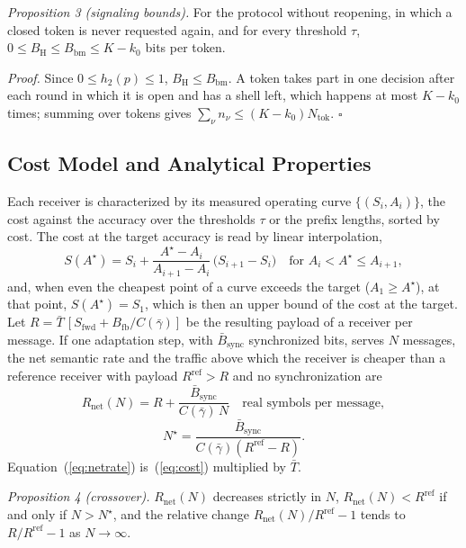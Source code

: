 \emph{Proposition 3 (signaling bounds).} For the protocol without reopening, in which a closed token is never requested again, and for every threshold $\tau$, $0\le B_\mathrm{H}\le B_\mathrm{bm}\le K-k_0$ bits per token.

\emph{Proof.} Since $0\le h_2(p)\le 1$, $B_\mathrm{H}\le B_\mathrm{bm}$. A token takes part in one decision after each round in which it is open and has a shell left, which happens at most $K-k_0$ times; summing over tokens gives $\sum_\nu n_\nu\le (K-k_0)N_\mathrm{tok}$. $\square$

\subsection{Cost Model and Analytical Properties}
\label{sec:method-cost}

Each receiver is characterized by its measured operating curve $\{(S_i,A_i)\}$, the cost against the accuracy over the thresholds $\tau$ or the prefix lengths, sorted by cost. The cost at the target accuracy is read by linear interpolation,
\begin{equation}
S(A^\star) = S_i + \frac{A^\star - A_i}{A_{i+1}-A_i}\,\bigl(S_{i+1}-S_i\bigr)\quad\text{for } A_i < A^\star \le A_{i+1},
\label{eq:readoff}
\end{equation}
and, when even the cheapest point of a curve exceeds the target ($A_1\ge A^\star$), at that point, $S(A^\star) = S_1$, which is then an upper bound of the cost at the target. Let $R = \bar{T}\,[S_\mathrm{fwd}+B_\mathrm{fb}/C(\bar{\gamma})]$ be the resulting payload of a receiver per message. If one adaptation step, with $\bar{B}_\mathrm{sync}$ synchronized bits, serves $N$ messages, the net semantic rate and the traffic above which the receiver is cheaper than a reference receiver with payload $R^\mathrm{ref}>R$ and no synchronization are
\begin{equation}
R_\mathrm{net}(N) = R + \frac{\bar{B}_\mathrm{sync}}{C(\bar{\gamma})\,N}\quad\text{real symbols per message},
\label{eq:netrate}
\end{equation}
\begin{equation}
N^\star = \frac{\bar{B}_\mathrm{sync}}{C(\bar{\gamma})\left(R^\mathrm{ref}-R\right)} .
\label{eq:crossover}
\end{equation}
Equation~(\ref{eq:netrate}) is~(\ref{eq:cost}) multiplied by $\bar{T}$.

\emph{Proposition 4 (crossover).} $R_\mathrm{net}(N)$ decreases strictly in $N$, $R_\mathrm{net}(N) < R^\mathrm{ref}$ if and only if $N > N^\star$, and the relative change $R_\mathrm{net}(N)/R^\mathrm{ref} - 1$ tends to $R/R^\mathrm{ref}-1$ as $N\to\infty$.

